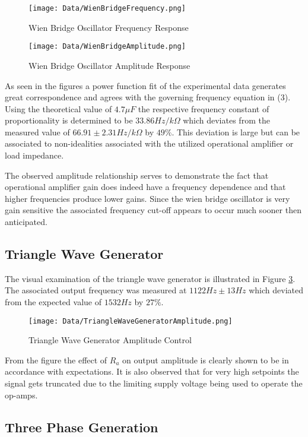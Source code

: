 \documentclass[12pt]{article}
\begin{document}
\begin{figure}[H]
\centering
\caption{Wien Bridge Oscillator Frequency Response}
\texttt{[image: Data/WienBridgeFrequency.png]}
\label{WBOFrequency}
\end{figure}

\begin{figure}[H]
\centering
\caption{Wien Bridge Oscillator Amplitude Response}
\texttt{[image: Data/WienBridgeAmplitude.png]}
\label{WBOAmplitude}
\end{figure}

As seen in the figures a power function fit of the experimental data generates great correspondence and agrees with the governing frequency equation in (3). Using the theoretical value of $4.7\mu F$ the respective frequency constant of proportionality is determined to be $33.86Hz/k\Omega$ which deviates from the measured value of $66.91\pm2.31 Hz/k\Omega$ by $49\%$. This deviation is large but can be associated to non-idealities associated with the utilized operational amplifier or load impedance.

The observed amplitude relationship serves to demonstrate the fact that operational amplifier gain does indeed have a frequency dependence and that higher frequencies produce lower gains. Since the wien bridge oscillator is very gain sensitive the associated frequency cut-off appears to occur much sooner then anticipated.
\pagebreak
\subsection{Triangle Wave Generator}%

The visual examination of the triangle wave generator is illustrated in Figure \ref{TWGAmplitude}. The associated output frequency was measured at $1122Hz\pm 13Hz$ which deviated from the expected value of $1532Hz$ by $27\%$. 

\begin{figure}[H]
\centering
\caption{Triangle Wave Generator Amplitude Control}
\texttt{[image: Data/TriangleWaveGeneratorAmplitude.png]}
\label{TWGAmplitude}
\end{figure}

From the figure the effect of $R_a$ on output amplitude is clearly shown to be in accordance with expectations. It is also observed that for very high setpoints the signal gets truncated due to the limiting supply voltage being used to operate the op-amps.
\pagebreak
\subsection{Three Phase Generation}%
\end{document}
